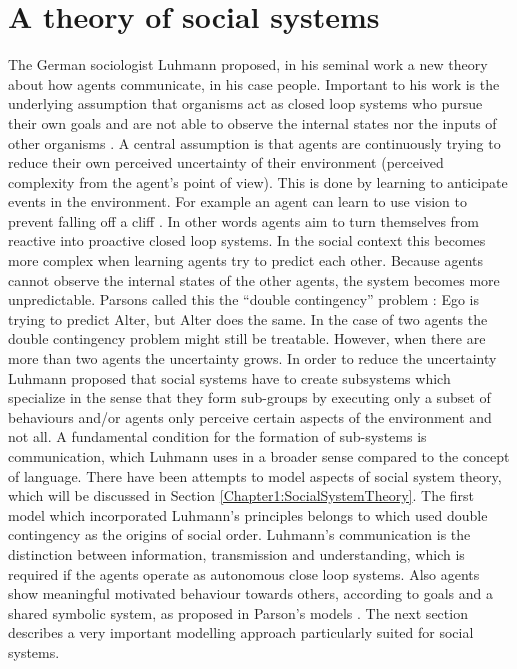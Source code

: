 
\section{A theory of social systems}
The German sociologist Luhmann proposed, in his seminal work \citep{Luhmann94} a
new theory about how agents communicate, in his case people. Important to his
work is the underlying assumption that organisms act as closed loop systems
\citep{Wiener61,Glasersfeld1995} who pursue their own goals and are not able to observe
the internal states nor the inputs of other organisms \citep{vonFoerster60}.
A central assumption is that agents are continuously trying to reduce their own
perceived uncertainty of their environment (perceived complexity from the
agent's point of view). This is done by learning to anticipate events in the
environment. For example an agent can learn to use vision to prevent falling off
a cliff \citep{Verschure91}. In other words agents aim to turn
themselves from reactive into proactive closed loop systems.
In the social context this becomes more complex when learning agents try to
predict each other. Because agents cannot observe the internal states of the
other agents, the system becomes more unpredictable. Parsons called this the
“double contingency” problem \citep{Parsons77}:
Ego is trying to predict Alter, but Alter does the same.
In the case of two agents the double contingency problem might still
be treatable. However, when there are more than two agents the uncertainty
grows.
In order to reduce the uncertainty Luhmann proposed that social systems
have to create subsystems which specialize \citep{Luhmann94} in the sense that
they form sub-groups by executing only a subset of behaviours and/or agents
only perceive certain aspects of the environment and not all.
A fundamental condition for the formation of sub-systems is communication, 
which Luhmann uses in a broader sense compared to the concept of language.
There have been attempts to model aspects of social system theory, which 
will be discussed in Section \ref{Chapter1:SocialSystemTheory}.
The first model which incorporated Luhmann's principles belongs to 
\citet{SocialOrderScalability} which used 
double contingency as the origins of social order. 
Luhmann's communication is the distinction between information, transmission
and understanding, which is required if the agents operate as autonomous close
loop systems. Also agents show meaningful motivated behaviour towards
others, according to goals and a shared symbolic system, as proposed in Parson's
models \citep{Parsons51,Parsons77}.
The next section describes a very important modelling approach particularly suited
for social systems.


